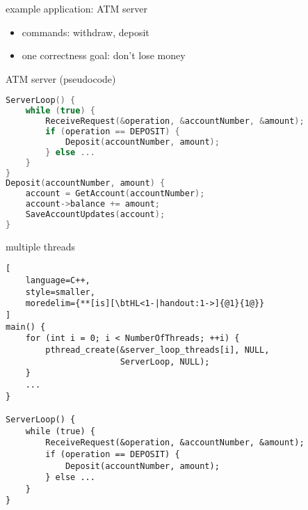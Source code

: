 \usetikzlibrary{fit}
% 

\begin{frame}{example application: ATM server}
\begin{itemize}
    \item commands: withdraw, deposit
    \item one correctness goal: don't lose money
\end{itemize}
\end{frame}

\begin{frame}[fragile,label=serverCode]{ATM server}
\vspace{-.5cm}
{\small (pseudocode)}
\begin{lstlisting}[language=C++,style=small]
ServerLoop() {
    while (true) {
        ReceiveRequest(&operation, &accountNumber, &amount);
        if (operation == DEPOSIT) {
            Deposit(accountNumber, amount);
        } else ...
    }
}
Deposit(accountNumber, amount) {
    account = GetAccount(accountNumber);
    account->balance += amount;
    SaveAccountUpdates(account);
}
\end{lstlisting}
\end{frame}


\begin{frame}[fragile,label=threadedServerLoop]{multiple threads}
\begin{lstlisting}[
    language=C++,
    style=smaller,
    moredelim={**[is][\btHL<1-|handout:1->]{@1}{1@}}
]
main() {
    for (int i = 0; i < NumberOfThreads; ++i) {
        pthread_create(&server_loop_threads[i], NULL,
                       ServerLoop, NULL);
    }
    ...
}

ServerLoop() {
    while (true) {
        ReceiveRequest(&operation, &accountNumber, &amount);
        if (operation == DEPOSIT) {
            Deposit(accountNumber, amount);
        } else ...
    }
}
\end{lstlisting}
\end{frame}
